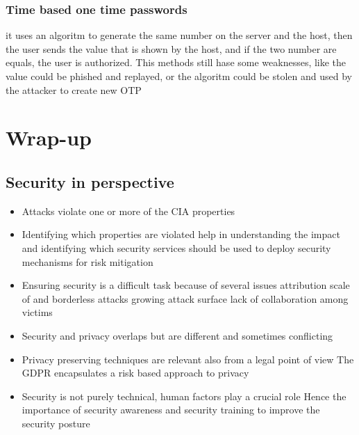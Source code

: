 \documentclass[12pt, a4paper]{article}
\begin{document}
\subsubsection{Time based one time passwords}
it uses an algoritm to generate the same number on the server and the host, then the user sends the value that is shown 
by the host, and if the two number are equals, the user is authorized. This methods still hase some weaknesses, like the
value could be phished and replayed, or the algoritm could be stolen and used by the attacker to create new OTP



\newpage
\section{Wrap-up}
\subsection{Security in perspective}
\begin{itemize}
    \item Attacks violate one or more of the CIA properties
    \item Identifying which properties are violated help in
    \subitem understanding the impact and
    \subitem identifying which security services should be used to deploy security mechanisms for risk mitigation
    \item Ensuring security is a difficult task because of several issues
    \subitem attribution
    \subitem scale of and borderless attacks
    \subitem growing attack surface
    \subitem lack of collaboration among victims
    \item Security and privacy overlaps but are different and sometimes conflicting
    \item Privacy preserving techniques are relevant also from a legal point of view
    \subitem The GDPR encapsulates a risk based approach to privacy
    \item Security is not purely technical, human factors play a crucial role
    \subitem Hence the importance of security awareness and security training to improve the security posture
\end{itemize}
\end{document}

